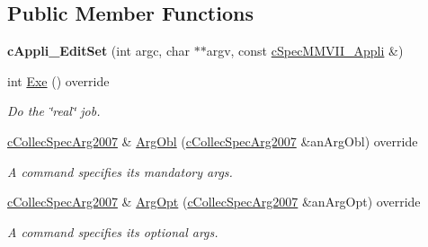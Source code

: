 \subsection*{Public Member Functions}
\begin{DoxyCompactItemize}
\item 
{\bfseries c\+Appli\+\_\+\+Edit\+Set} (int argc, char $\ast$$\ast$argv, const \hyperlink{classMMVII_1_1cSpecMMVII__Appli}{c\+Spec\+M\+M\+V\+I\+I\+\_\+\+Appli} \&)\hypertarget{classMMVII_1_1cAppli__EditSet_a780c0e96fd69e6636e1951794668ea3f}{}\label{classMMVII_1_1cAppli__EditSet_a780c0e96fd69e6636e1951794668ea3f}

\item 
int \hyperlink{classMMVII_1_1cAppli__EditSet_ae69b813ed3b7f83e6338e561b3233425}{Exe} () override\hypertarget{classMMVII_1_1cAppli__EditSet_ae69b813ed3b7f83e6338e561b3233425}{}\label{classMMVII_1_1cAppli__EditSet_ae69b813ed3b7f83e6338e561b3233425}

\begin{DoxyCompactList}\small\item\em Do the \char`\"{}real\char`\"{} job. \end{DoxyCompactList}\item 
\hyperlink{classMMVII_1_1cCollecSpecArg2007}{c\+Collec\+Spec\+Arg2007} \& \hyperlink{classMMVII_1_1cAppli__EditSet_a6864d996726dd4d408943f3a67c748a8}{Arg\+Obl} (\hyperlink{classMMVII_1_1cCollecSpecArg2007}{c\+Collec\+Spec\+Arg2007} \&an\+Arg\+Obl) override\hypertarget{classMMVII_1_1cAppli__EditSet_a6864d996726dd4d408943f3a67c748a8}{}\label{classMMVII_1_1cAppli__EditSet_a6864d996726dd4d408943f3a67c748a8}

\begin{DoxyCompactList}\small\item\em A command specifies its mandatory args. \end{DoxyCompactList}\item 
\hyperlink{classMMVII_1_1cCollecSpecArg2007}{c\+Collec\+Spec\+Arg2007} \& \hyperlink{classMMVII_1_1cAppli__EditSet_addc6e1b27c32bb24c80f973793820211}{Arg\+Opt} (\hyperlink{classMMVII_1_1cCollecSpecArg2007}{c\+Collec\+Spec\+Arg2007} \&an\+Arg\+Opt) override\hypertarget{classMMVII_1_1cAppli__EditSet_addc6e1b27c32bb24c80f973793820211}{}\label{classMMVII_1_1cAppli__EditSet_addc6e1b27c32bb24c80f973793820211}

\begin{DoxyCompactList}\small\item\em A command specifies its optional args. \end{DoxyCompactList}\end{DoxyCompactItemize}
